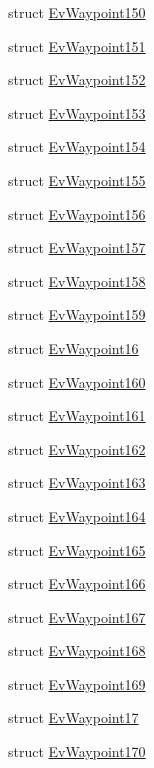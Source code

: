 \begin{DoxyCompactItemize}
\item 
struct \hyperlink{structsmacc_1_1EvWaypoint150}{Ev\+Waypoint150}
\item 
struct \hyperlink{structsmacc_1_1EvWaypoint151}{Ev\+Waypoint151}
\item 
struct \hyperlink{structsmacc_1_1EvWaypoint152}{Ev\+Waypoint152}
\item 
struct \hyperlink{structsmacc_1_1EvWaypoint153}{Ev\+Waypoint153}
\item 
struct \hyperlink{structsmacc_1_1EvWaypoint154}{Ev\+Waypoint154}
\item 
struct \hyperlink{structsmacc_1_1EvWaypoint155}{Ev\+Waypoint155}
\item 
struct \hyperlink{structsmacc_1_1EvWaypoint156}{Ev\+Waypoint156}
\item 
struct \hyperlink{structsmacc_1_1EvWaypoint157}{Ev\+Waypoint157}
\item 
struct \hyperlink{structsmacc_1_1EvWaypoint158}{Ev\+Waypoint158}
\item 
struct \hyperlink{structsmacc_1_1EvWaypoint159}{Ev\+Waypoint159}
\item 
struct \hyperlink{structsmacc_1_1EvWaypoint16}{Ev\+Waypoint16}
\item 
struct \hyperlink{structsmacc_1_1EvWaypoint160}{Ev\+Waypoint160}
\item 
struct \hyperlink{structsmacc_1_1EvWaypoint161}{Ev\+Waypoint161}
\item 
struct \hyperlink{structsmacc_1_1EvWaypoint162}{Ev\+Waypoint162}
\item 
struct \hyperlink{structsmacc_1_1EvWaypoint163}{Ev\+Waypoint163}
\item 
struct \hyperlink{structsmacc_1_1EvWaypoint164}{Ev\+Waypoint164}
\item 
struct \hyperlink{structsmacc_1_1EvWaypoint165}{Ev\+Waypoint165}
\item 
struct \hyperlink{structsmacc_1_1EvWaypoint166}{Ev\+Waypoint166}
\item 
struct \hyperlink{structsmacc_1_1EvWaypoint167}{Ev\+Waypoint167}
\item 
struct \hyperlink{structsmacc_1_1EvWaypoint168}{Ev\+Waypoint168}
\item 
struct \hyperlink{structsmacc_1_1EvWaypoint169}{Ev\+Waypoint169}
\item 
struct \hyperlink{structsmacc_1_1EvWaypoint17}{Ev\+Waypoint17}
\item 
struct \hyperlink{structsmacc_1_1EvWaypoint170}{Ev\+Waypoint170}
\item 

\end{DoxyCompactItemize}
